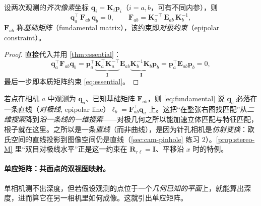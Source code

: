 \begin{theorem}[基础矩阵与对极线]\label{thm:fundamental}
设两次观测的\emph{齐次像素}坐标 $\mathbf{q}_i=\mathbf{K}_i\mathbf{p}_i$（$i=a,b$，可有不同内参），则
\begin{equation}
  \mathbf{q}_a^\top\,\mathbf{F}_{ab}\,\mathbf{q}_b=0,\qquad
  \mathbf{F}_{ab}=\mathbf{K}_a^{-\top}\,\mathbf{E}_{ab}\,\mathbf{K}_b^{-1},
  \label{eq:fundamental}
\end{equation}
$\mathbf{F}_{ab}$ 称\emph{基础矩阵}（fundamental matrix），该约束即\emph{对极约束}（epipolar constraint）。
\end{theorem}
\begin{proof}
直接代入并用 \cref{thm:essential}\cite{barfoot2024state}：
\[
  \mathbf{q}_a^\top\mathbf{F}_{ab}\mathbf{q}_b
  =\mathbf{p}_a^\top\underbrace{\mathbf{K}_a^\top\mathbf{K}_a^{-\top}}_{\mathbf{I}}\mathbf{E}_{ab}
  \underbrace{\mathbf{K}_b^{-1}\mathbf{K}_b}_{\mathbf{I}}\mathbf{p}_b
  =\mathbf{p}_a^\top\mathbf{E}_{ab}\mathbf{p}_b=0,
\]
最后一步即本质矩阵约束 \cref{eq:essential}。
\end{proof}

\begin{insight}[对极约束把匹配搜索从二维降到一维]
若点在相机 $a$ 中观测为 $\mathbf{q}_a$、已知基础矩阵 $\mathbf{F}_{ab}$，则 \cref{eq:fundamental} 说 $\mathbf{q}_b$ 必落在一条直线（\emph{对极线}, epipolar line）$\boldsymbol\ell_b=\mathbf{F}_{ab}^\top\mathbf{q}_a$ 上\cite{barfoot2024state}。这把“在整张右图找匹配”从\emph{二维搜索}降到\emph{沿一条线的一维搜索}——对极几何之所以能加速立体匹配与特征匹配，根子就在这里。之所以是一条\emph{直线}（而非曲线），是因为针孔相机是\emph{仿射变换}：欧氏空间的直线投影到图像空间仍是直线（\cref{sec:cam-pinhole} 练习 2）。\cref{prop:stereo-M} 里“双目对极线水平”正是这一约束在 $\mathbf{R}_{r\ell}=\mathbf{I}$、平移沿 $x$ 时的特例。
\end{insight}

\paragraph{单应矩阵：共面点的双视图映射。}
单相机测不出深度，但若假设观测的点位于一个\emph{几何已知的平面}上，就能算出深度，进而算它在另一相机里如何成像。这就引出单应矩阵\cite{barfoot2024state}。

